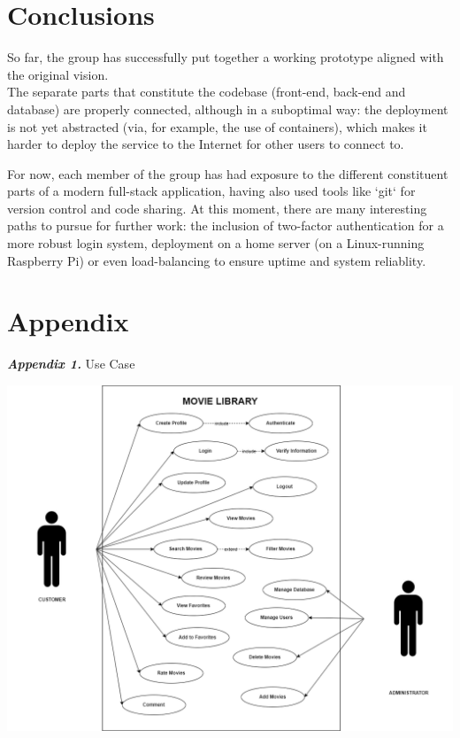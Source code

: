 \documentclass[letterpaper,twocolumn]{article}
\newcommand{\myparagraph}[1]{\vspace{0.1cm}\noindent \textbf{\textit{#1.}}}
\begin{document}
\section{Conclusions}

So far, the group has successfully put together a working prototype aligned with the original vision. \\

The separate parts that constitute the codebase (front-end, back-end and database) are properly connected, although in a suboptimal way: the deployment is not yet abstracted (via, for example, the use of containers), which makes it harder to deploy the service to the Internet for other users to connect to.

For now, each member of the group has had exposure to the different constituent parts of a modern full-stack application, having also used tools like `git` for version control and code sharing. At this moment, there are many interesting paths to pursue for further work: the inclusion of two-factor authentication for a more robust login system, deployment on a home server (on a Linux-running Raspberry Pi) or even load-balancing to ensure uptime and system reliablity. 


\clearpage

\vfill %

\section{Appendix}

\myparagraph{Appendix 1} Use Case

\includegraphics[scale=0.40]{images/USE CASE WET.drawio.png}\\[0.1cm] 
\end{document}
